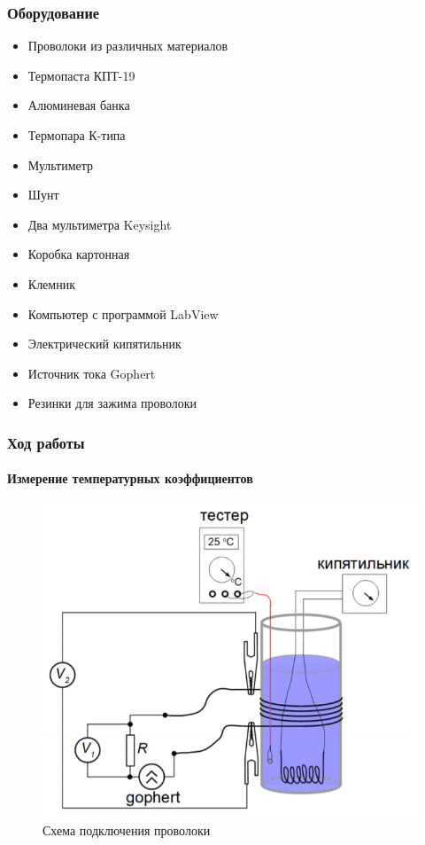 \documentclass[8pt,pdf,hyperref={unicode}]{beamer}
\begin{document}
\begin{frame}
	\frametitle{Оборудование}
	\begin{center}
		\begin{itemize}
			\item Проволоки из различных материалов
			\item Термопаста КПТ-19
			\item Алюминевая банка
			\item Термопара К-типа
			\item Мультиметр
			\item Шунт
			\item Два мультиметра Keysight
			\item Коробка картонная
			\item Клемник
			\item Компьютер с программой LabView
			\item Электрический кипятильник
			\item Источник тока Gophert
			\item Резинки для зажима проволоки
		\end{itemize}
	\end{center}
\end{frame}
\begin{frame}
	\frametitle{Ход работы}
	\framesubtitle{Измерение температурных коэффициентов}
	\begin{center}
		\begin{figure}[h!]
			\centering
			\includegraphics[width=.6\linewidth]{Lab3_1.png}
			\caption{Схема подключения проволоки}
			\label{fig1}
		\end{figure}		
	\end{center}
\end{frame}
\end{document}
